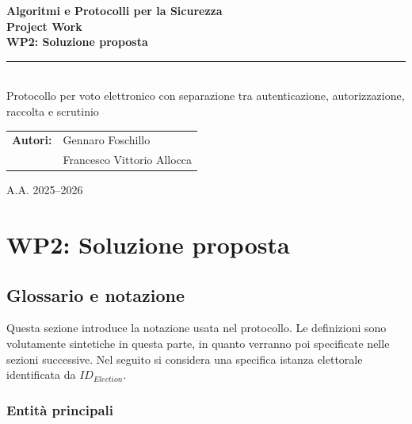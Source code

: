 \documentclass[a4paper,12pt]{article}
\begin{document}
\begin{titlepage}
	\centering
	\vspace*{1.7cm}
	{\Large\color{MainBlue}\textbf{Algoritmi e Protocolli per la Sicurezza}\\[0.4cm]}
	{\Huge\bfseries Project Work\\[0.25cm]}
	{\LARGE\bfseries WP2: Soluzione proposta\\[0.6cm]}
	\textcolor{MainBlue}{\rule{0.82\textwidth}{1.2pt}}\\[1.0cm]
	{\large Protocollo per voto elettronico con separazione tra autenticazione, autorizzazione, raccolta e scrutinio}\\[2.2cm]
	\begin{tabular}{rl}
		\textbf{Autori:} & Gennaro Foschillo \\
		                 & Francesco Vittorio Allocca \\
	\end{tabular}
	\vfill
	{\large A.A. 2025--2026}
\end{titlepage}

\tableofcontents
\newpage
{}

\section{WP2: Soluzione proposta}

\subsection{Glossario e notazione}

Questa sezione introduce la notazione usata nel protocollo. Le definizioni sono volutamente sintetiche in questa parte, in quanto verranno poi specificate nelle sezioni successive. Nel seguito si considera una specifica istanza elettorale identificata da
$ID_{Election}$.

\subsubsection{Entità principali}
\end{document}
